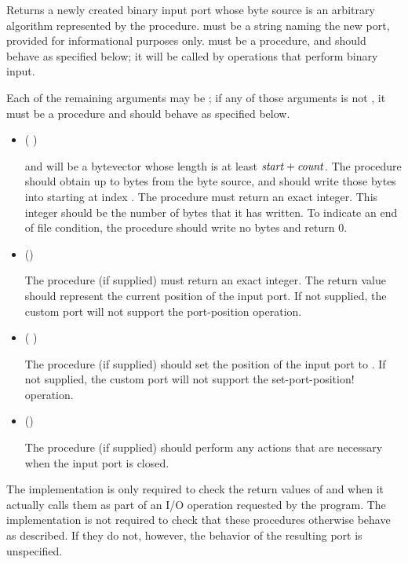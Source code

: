 \begin{entry}{%
}

Returns a newly created binary input port whose byte source is
an arbitrary algorithm represented by the  procedure.
 must be a string naming the new port,
provided for informational purposes only.
 must be a procedure, and should behave as specified
below; it will be called by operations that perform binary input.

Each of the remaining arguments may be \schfalse{}; if any of
those arguments is not \schfalse{}, it must be a procedure and
should behave as specified below.
   
\begin{itemize}
\item {\cf (   )}
       
  and  will be a bytevector whose length is at least
  $\textnormal{\textit{start}} + \textnormal{\textit{count}}$.
  The  procedure should obtain up to  bytes
  from the byte source, and should write those bytes
  into  starting at index .
  The  procedure must return an exact integer.  This
  integer should be the number of bytes that it has written.
  To indicate an end of file condition, the 
  procedure should write no bytes and return 0.

\item {\cf ()}
       
  The  procedure (if supplied) must return an exact
  integer.  The return value should represent the current position of
  the input port.  If not supplied, the custom port will not support
  the {\cf port-position} operation.
  
\item {\cf ( )}
       
  The  procedure (if supplied) should set the
  position of the input port to .  If not supplied, the custom
  port will not support the {\cf set-port-position!} operation.
       
\item {\cf ()}
       
  The  procedure (if supplied) should perform any actions
  that are necessary when the input port is closed.
\end{itemize}

\implresp The implementation is only required to check the return
values of  and  when it actually calls
them as part of an I/O operation requested by the program.  The
implementation is not required to check that these procedures
otherwise behave as described.  If they do not, however, the behavior
of the resulting port is unspecified.
\end{entry}

